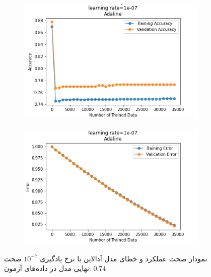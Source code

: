 \documentclass[12pt, a4paper]{article}
\begin{document}
\vspace{1cm}
\begin{figure}[h]
    \begin{subfigure}{0.45\linewidth}
        \centering
        \includegraphics[width=\linewidth]{images/3/adaline/lr/acc_1e-07.png}
    \end{subfigure}
    \hfil
    \begin{subfigure}{0.45\linewidth}
        \centering
        \includegraphics[width=\linewidth]{images/3/adaline/lr/error_1e-07.png}
    \end{subfigure}
    \caption{نمودار صحت عملکرد‌ و خطای مدل آدالاین با نرخ یادگیری $10^{-7}$
    \newline
    صحت نهایی مدل در داده‌های آزمون: $0.74$}
    \label{adaline_lr_1e7}
\end{figure}
\vspace{1cm}
\end{document}
